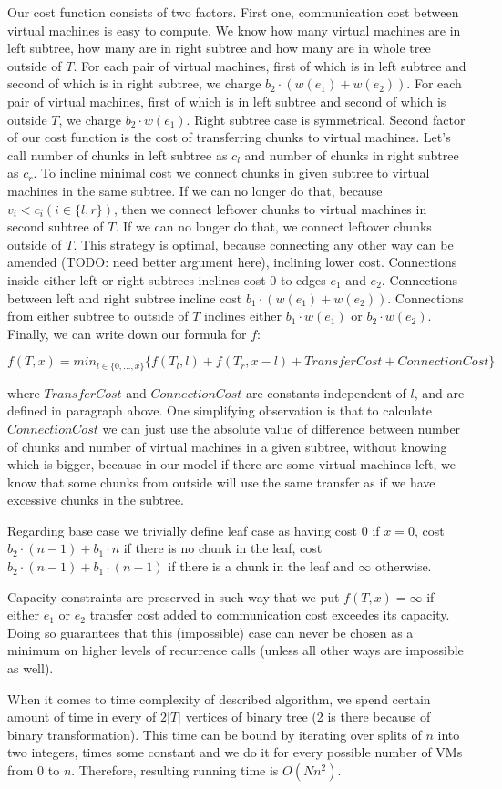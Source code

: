 Our cost function consists of two factors. First one, communication cost
between virtual machines is easy to compute. We know how many virtual
machines are in left subtree, how many are in right subtree and how
many are in whole tree outside of $T$. For each pair of virtual
machines, first of which is in left subtree and second of which is in
right subtree, we charge $b_2 \cdot (w(e_1) + w(e_2))$. For each pair
of virtual machines, first of which is in left subtree and second of
which is outside $T$, we charge $b_2 \cdot w(e_1)$. Right subtree case
is symmetrical. Second factor of our cost function is the cost of
transferring chunks to virtual machines. Let's call number of chunks
in left subtree as $c_l$ and number of chunks in right subtree as
$c_r$. To incline minimal cost we connect chunks in given subtree to
virtual machines in the same subtree. If we can no longer do that,
because $v_i < c_i (i \in \{l,r\})$, then we connect leftover chunks
to virtual machines in second subtree of $T$. If we can no longer do
that, we connect leftover chunks outside of $T$. This strategy is
optimal, because connecting any other way can be amended (TODO: need
better argument here), inclining lower cost. Connections inside either
left or right subtrees inclines cost $0$ to edges $e_1$ and
$e_2$. Connections between left and right subtree incline cost $b_1
\cdot (w(e_1) + w(e_2))$. Connections from either subtree to outside
of $T$ inclines either $b_1 \cdot w(e_1)$ or $b_2 \cdot
w(e_2)$. Finally, we can write down our formula for $f$:

$$ f(T, x) = min_{l \in \{0, \ldots, x\}} \{ f(T_l, l) + f(T_r, x - l)
+ TransferCost + ConnectionCost\} $$

where $TransferCost$ and $ConnectionCost$ are constants independent of
$l$, and are defined in paragraph above. One simplifying observation
is that to calculate $ConnectionCost$ we can just use the absolute
value of difference
between number of chunks and number of virtual machines in a given
subtree, without knowing which is bigger, because in our model if
there are some virtual machines left, we know that some chunks from
outside will use the same transfer as if we have excessive chunks in
the subtree.

Regarding base case we
trivially define leaf case as having cost $0$ if $x = 0$, cost $b_2
\cdot (n-1) + b_1\cdot n$ if there is no chunk in the leaf, cost $b_2 \cdot (n-1) +
b_1 \cdot (n-1)$ if there is a chunk in the leaf and $\infty$ otherwise.

Capacity constraints are preserved in such way that we put $f(T, x) =
\infty$ if either $e_1$ or $e_2$ transfer cost added to communication
cost exceedes its capacity. Doing so guarantees that this
(impossible) case can never be chosen as a minimum on higher levels of
recurrence calls (unless all other ways are impossible as well). 

When it comes to time complexity of described algorithm, we spend
certain amount of time in every of $2|T|$ vertices of binary
tree (2 is there because of binary transformation). This time can be
bound by iterating over splits of $n$ into two integers, times some
constant and we do it for every possible number of VMs from $0$ to $n$. Therefore, resulting running time is $O(Nn^2)$.
